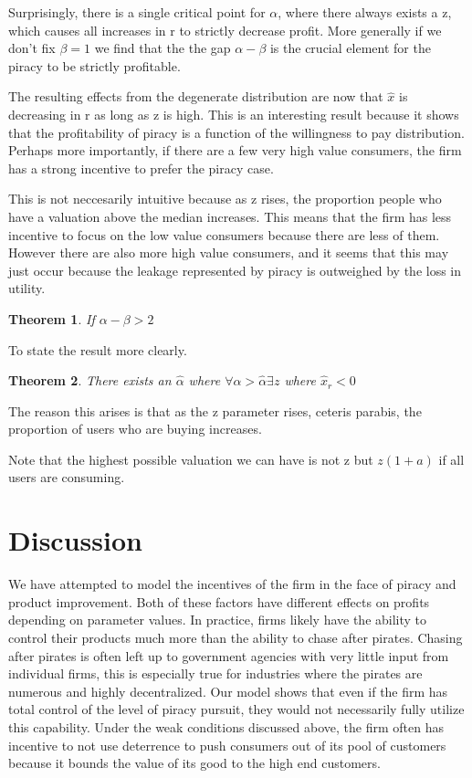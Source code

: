 \documentclass{article}
\newtheorem{theorem}{Theorem}
\begin{document}
Surprisingly, there is a single critical point for $\alpha$, where there always exists a z, which causes all increases in r to strictly decrease profit. More generally if we don't fix $\beta=1$ we find that the the gap $\alpha- \beta$ is the crucial element for the piracy to be strictly profitable. 

The resulting effects from the degenerate distribution are now that $\hat{x}$ is decreasing in r as long as z is high. This is an interesting result because it shows that the profitability of piracy is a function of the willingness to pay distribution. Perhaps more importantly, if there are a few very high value consumers, the firm has a strong incentive to prefer the piracy case. 

This is not neccesarily intuitive because as z rises, the proportion people who have a valuation above the median increases. This means that the firm has less incentive to focus on the low value consumers because there are less of them. However there are also more high value consumers, and it seems that this may just occur because the leakage represented by piracy is outweighed by the loss in utility. 

\begin{theorem}
If $\alpha-\beta>2$
\end{theorem}

To state the result more clearly. 
\begin{theorem}
There exists an $\hat{\alpha}$ where $\forall \alpha>\hat{\alpha} \exists z$ where $\hat{x}_{r}<0$
\end{theorem}

The reason this arises is that as the z parameter rises, ceteris parabis, the proportion of users who are buying increases. 

Note that the highest possible valuation we can have is not z but $z(1+a)$ if all users are consuming. 



\section{Discussion}
We have attempted to model the incentives of the firm in the face of piracy and product improvement. Both of these factors have different effects on profits depending on parameter values. In practice, firms likely have the ability to control their products much more than the ability to chase after pirates. Chasing after pirates is often left up to government agencies with very little input from individual firms, this is especially true for industries where the pirates are numerous and highly decentralized. Our model shows that even if the firm has total control of the level of piracy pursuit, they would not necessarily fully utilize this capability. Under the weak conditions discussed above, the firm often has incentive to not use deterrence to push consumers out of its pool of customers because it bounds the value of its good to the high end customers. 
\end{document}
